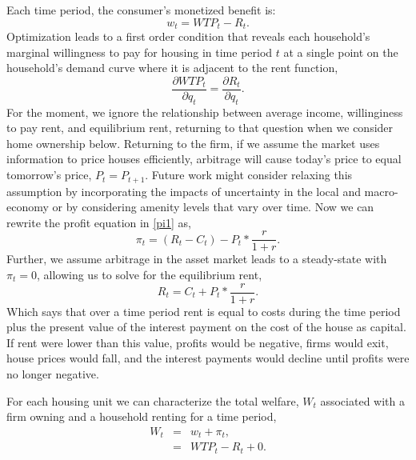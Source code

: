 \documentclass[ecta,nameyear,draft]{econsocart}
\theoremstyle{plain}
\theoremstyle{remark}
\begin{document}
Each time period, the consumer’s monetized benefit is:
\begin{equation*}
	 w_t=\mathit{WTP}_t-R_t.
\end{equation*}
Optimization leads to a first order condition that reveals each household's marginal willingness
to pay for housing in time period $t$ at a single point on the household’s demand curve where it is adjacent to the rent function,
\begin{equation}
	\frac{\partial \mathit{WTP}_t}{\partial q_t}=\frac{\partial R_t}{\partial q_t} \label{foc}.
\end{equation}
For the moment, we ignore the relationship between average income, willinginess to pay rent, and equilibrium rent, returning to that question when we consider home ownership below. Returning to the firm, if we assume the market uses information to price houses efficiently, arbitrage will cause today’s price to equal tomorrow’s price, $P_t=P_{t+1}$. Future work might consider relaxing this assumption by incorporating the impacts of uncertainty in the local and macro-economy or by considering amenity levels that vary over time. Now we can rewrite the profit equation in \ref{pi1} as,
\begin{equation}
	\pi_t=(R_t-C_t)-P_t*\frac{r}{1+r}.\label{pi1.1}
\end{equation}
Further, we assume arbitrage in the asset market leads to a steady-state with $\pi_t=0$, allowing us to solve for the equilibrium rent,
\begin{equation*}
	R_t=C_t+P_t*\frac{r}{1+r}.
\end{equation*}
Which says that over a time period rent is equal to costs during the time period plus the present value of
the interest payment on the cost of the house as capital. If rent were lower than this value, profits
would be negative, firms would exit, house prices would fall, and the interest payments would decline until profits were no longer negative.

For each housing unit we can characterize the total welfare, $W_t$ associated with a firm owning and a household renting for a time period,
\begin{eqnarray*}
	W_t & = & w_t+\pi_t,\\
	& = & \mathit{WTP}_t-R_t+0.
\end{eqnarray*}
\end{document}
